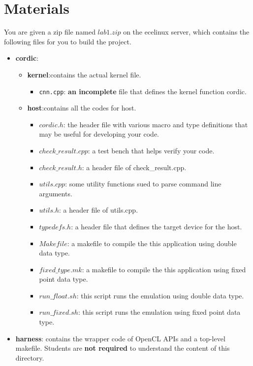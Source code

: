 \documentclass[paper=letter, fontsize=11.6pt]{scrartcl} %
\numberwithin{equation}{section} %
\numberwithin{figure}{section} %
\numberwithin{table}{section} %
\begin{document}
\section{Materials}
You are given a zip file named  
$lab1.zip$ on the ecelinux server, which contains the following files for you to build the project.
\begin{itemize}

\item \textbf{cordic}:
  \begin{itemize}
  \item \textbf{kernel}:contains the actual kernel file.
    \begin{itemize}
    \item \texttt{cnn.cpp}: \textbf{an incomplete} file that defines the kernel function cordic.
    \end{itemize}
  \item \textbf{host}:contains all the codes for host.
     \begin{itemize}
     \item $cordic.h$: the header file with various macro and type definitions that may be useful for developing your code.
\item $check\_result.cpp$: a test bench that helps verify your code.
\item $check\_result.h$: a header file of check\_result.cpp.
\item $utils.cpp$: some utility functions sued to parse command line arguments.
\item $utils.h$: a header file of utils.cpp.
\item $typedefs.h$: a header file that defines the target device for the host.
\item $Makefile$: a makefile to compile the this application using double data type.
\item $fixed\_type.mk$: a makefile to compile the this application using fixed point data type.
\item $run\_float.sh$: this script runs the emulation using double data type.
\item $run\_fixed.sh$: this script runs the emulation using fixed point data type.
    \end{itemize}
  \end{itemize}
\item \textbf{harness}: contains the wrapper code of OpenCL APIs and a top-level makefile. Students are \textbf{not required} to understand the content of this directory.
\end{itemize}
\end{document}
